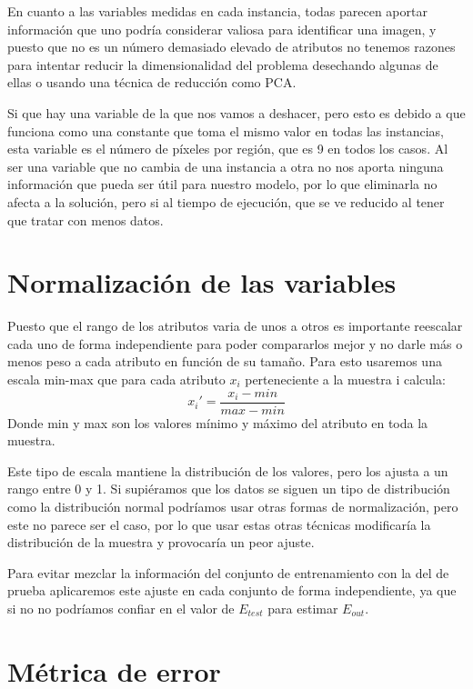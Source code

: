 \documentclass{article}
\begin{document}
	En cuanto a las variables medidas en cada instancia, todas parecen aportar información que uno podría considerar valiosa para identificar una imagen, y puesto que no es un número demasiado elevado de atributos no tenemos razones para intentar reducir la dimensionalidad del problema desechando algunas de ellas o usando una técnica de reducción como PCA.
	\par 
	Si que hay una variable de la que nos vamos a deshacer, pero esto es debido a que funciona como una constante que toma el mismo valor en todas las instancias, esta variable es el número de píxeles por región, que es 9 en todos los casos. Al ser una variable que no cambia de una instancia a otra no nos aporta ninguna información que pueda ser útil para nuestro modelo, por lo que eliminarla no afecta a la solución, pero si al tiempo de ejecución, que se ve reducido al tener que tratar con menos datos.
	
	\section{Normalización de las variables} %
	
	Puesto que el rango de los atributos varia de unos a otros es importante reescalar cada uno de forma independiente para poder compararlos mejor y no darle más o menos peso a cada atributo en función de su tamaño. Para esto usaremos una escala min-max que para cada atributo $x_i$ perteneciente a la muestra i calcula:
	\begin{equation}
	x_i' = \frac{x_i-min}{max-min}
	\end{equation}
	\indent Donde min y max son los valores mínimo y máximo del atributo en toda la muestra.
	\par 
	Este tipo de escala mantiene la distribución de los valores, pero los ajusta a un rango entre 0 y 1.  Si supiéramos que los datos se siguen un tipo de distribución como la distribución normal podríamos usar otras formas de normalización, pero este no parece ser el caso, por lo que usar estas otras técnicas modificaría la distribución de la muestra y provocaría un peor ajuste.
	\par 
	Para evitar mezclar la información del conjunto de entrenamiento con la del de prueba aplicaremos este ajuste en cada conjunto de forma independiente, ya que si no no podríamos confiar en el valor de $E_{test}$ para estimar $E_{out}$.
	
	\section{Métrica de error}
	
\end{document}
